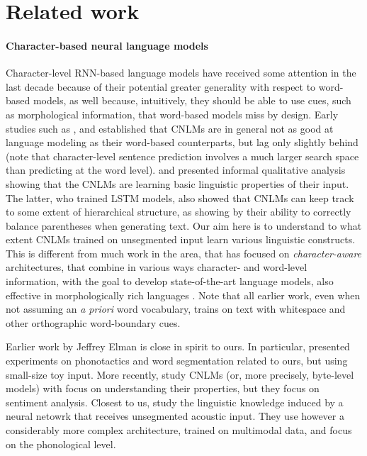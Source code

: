 \section{Related work}
\label{sec:related}

\paragraph{Character-based neural language models} Character-level
RNN-based language models have received some attention in the last
decade because of their potential greater generality with respect to
word-based models, as well because, intuitively, they should be able
to use cues, such as morphological information, that word-based models
miss by design. Early studies such as ,
 and  established
that CNLMs are in general not as good at language modeling as their
word-based counterparts, but lag only slightly behind (note that
character-level sentence prediction involves a much larger search
space than predicting at the word
level).  and 
presented informal qualitative analysis showing that the CNLMs are
learning basic linguistic properties of their input. The latter, who
trained LSTM models, also showed that CNLMs can keep track to some
extent of hierarchical structure, as showing by their ability to
correctly balance parentheses when generating text. Our aim here is to
understand to what extent CNLMs trained on unsegmented input learn
various linguistic constructs. This is different from much work in the
area, that has focused on \emph{character-aware} architectures, that
combine in various ways character- and word-level information, with
the goal to develop state-of-the-art language models, also effective
in morphologically rich languages \citep[see, e.g.,][and references
there]{Bojanowski:etal:2016,Kim:etal:2016,Gerz:etal:2018}. Note that
all earlier work, even when not assuming an \emph{a priori} word
vocabulary, trains on text with whitespace and other orthographic
word-boundary cues.

Earlier work by Jeffrey Elman is close in spirit to ours. In
particular,  presented experiments on phonotactics
and word segmentation related to ours, but using small-size toy
input. More recently, \cite{Radford:etal:2017} study CNLMs (or, more
precisely, byte-level models) with focus on understanding their
properties, but they focus on sentiment analysis. Closest to us,
\cite{Alishahi:etal:2017} study the linguistic knowledge induced by a
neural netowrk that receives unsegmented acoustic input. They use
however a considerably more complex architecture, trained on
multimodal data, and focus on the phonological level.

